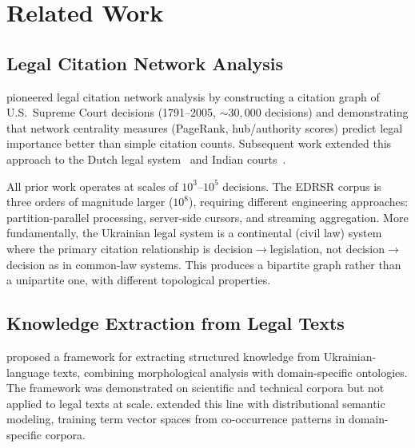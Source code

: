 \documentclass[11pt]{article}
\begin{document}
\section{Related Work}
\label{sec:related}

\subsection{Legal Citation Network Analysis}

\citet{fowler2007network} pioneered legal citation network analysis by constructing a citation graph of U.S.\ Supreme Court decisions (1791--2005, ${\sim}30{,}000$ decisions) and demonstrating that network centrality measures (PageRank, hub/authority scores) predict legal importance better than simple citation counts.
Subsequent work extended this approach to the Dutch legal system~\citep{winkels2012determining,geist2009using} and Indian courts~\citep{kumar2022citationnet}.

All prior work operates at scales of $10^3$--$10^5$ decisions.
The EDRSR corpus is three orders of magnitude larger ($10^8$), requiring different engineering approaches: partition-parallel processing, server-side cursors, and streaming aggregation.
More fundamentally, the Ukrainian legal system is a continental (civil law) system where the primary citation relationship is decision$\to$legislation, not decision$\to$decision as in common-law systems.
This produces a bipartite graph rather than a unipartite one, with different topological properties.

\subsection{Knowledge Extraction from Legal Texts}

\citet{palagin2012knowledge} proposed a framework for extracting structured knowledge from Ukrainian-language texts, combining morphological analysis with domain-specific ontologies.
The framework was demonstrated on scientific and technical corpora but not applied to legal texts at scale.
\citet{palagin2020distributional} extended this line with distributional semantic modeling, training term vector spaces from co-occurrence patterns in domain-specific corpora.
\end{document}
